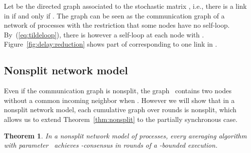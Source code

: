 \documentclass[a4paper]{article}
\theoremstyle{newthm}
\newtheorem{thm}{Theorem}
\begin{document}
Let  be the directed graph associated
	to the stochastic matrix , i.e.,  there is a link
	 in   if and only if .
The graph  can be seen as the communication graph of a network of
	 processes with the restriction that some nodes have no self-loop.
By~(\ref{eq:tildeloop}), there is however a self-loop at each  node  with .
Figure~\ref{fig:delay:reduction} shows part of    corresponding to
	one  link  in .


	


\subsection{Nonsplit network model}

Even if the communication graph  is nonsplit, 
	 the graph~ contains two nodes without a common 
	incoming neighbor when .
However we will show that in a nonsplit network model, each cumulative graph over  
	rounds is nonsplit, which allows us to extend Theorem~\ref{thm:nonsplit} to the
	partially synchronous case. 
	


\begin{thm}\label{thm:nonsplit:delay}
In a nonsplit network model of  processes, every averaging algorithm with 
	parameter~ achieves -consensus
	in 
	rounds of a -bounded execution.
\end{thm}
\end{document}
